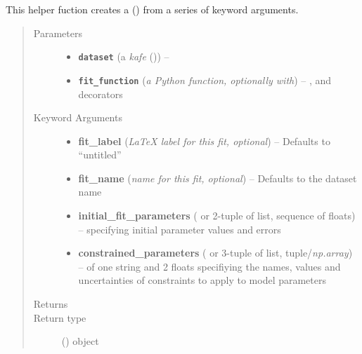 \documentclass[a4paper,10pt,english]{sphinxmanual}
\begin{document}
\begin{fulllineitems}
\label{module_doc:kafe.fit.build_fit}
This helper fuction creates a {\hyperref[module_doc:kafe.fit.Fit]{\emph{}}} () from a series of
keyword arguments.
\begin{quote}\begin{description}
\item[{Parameters}] \leavevmode\begin{itemize}
\item {} 
\textbf{\texttt{dataset}} (a \emph{kafe} {\hyperref[module_doc:kafe.dataset.Dataset]{\emph{}}} ()) -- 

\item {} 
\textbf{\texttt{fit\_function}} (\emph{a Python function, optionally with}) -- ,  and  decorators

\end{itemize}

\item[{Keyword Arguments}] \leavevmode\begin{itemize}
\item {} 
\textbf{fit\_label} (\emph{LaTeX label for this fit, optional}) --
Defaults to ``untitled''

\item {} 
\textbf{fit\_name} (\emph{name for this fit, optional}) --
Defaults to the dataset name

\item {} 
\textbf{initial\_fit\_parameters} ( or 2-tuple of list, sequence of floats) --
specifying initial parameter values and errors

\item {} 
\textbf{constrained\_parameters} ( or 3-tuple of list, tuple/\emph{np.array}) --
of one string and 2 floats specifiying the names, values and
uncertainties of constraints to apply to model parameters

\end{itemize}

\item[{Returns}] \leavevmode


\item[{Return type}] \leavevmode
{\hyperref[module_doc:kafe.fit.Fit]{\emph{}}} () object

\end{description}\end{quote}

\end{fulllineitems}
\end{document}
